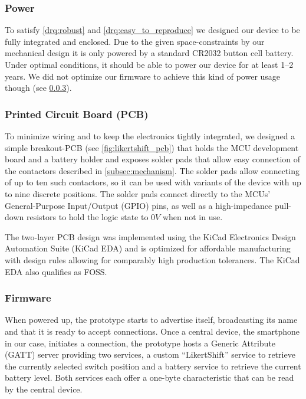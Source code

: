 \subsubsection{Power}

To satisfy \ref{drq:robust} and \ref{drq:easy_to_reproduce} we designed our device to be fully integrated and enclosed.
Due to the given space-constraints by our mechanical design it is only powered by a standard CR2032 button cell battery.
Under optimal conditions, it should be able to power our device for at least 1--2 years.
We did not optimize our firmware to achieve this kind of power usage though (see \ref{subsec:firmware}).

\subsubsection{Printed Circuit Board (PCB)}

To minimize wiring and to keep the electronics tightly integrated, we designed a simple breakout-PCB (see \autoref{fig:likertshift_pcb}) that holds the MCU development board and a battery holder and exposes solder pads that allow easy connection of the contactors described in \ref{subsec:mechanism}.
The solder pads allow connecting of up to ten such contactors, so it can be used with variants of the device with up to nine discrete positions.
The solder pads connect directly to the MCUs' General-Purpose Input/Output (GPIO) pins, as well as a high-impedance pull-down resistors to hold the logic state to $0V$ when not in use.

The two-layer PCB design was implemented using the KiCad Electronics Design Automation Suite (KiCad EDA) and is optimized for affordable manufacturing with design rules allowing for comparably high production tolerances.
The KiCad EDA also qualifies as FOSS.

\subsubsection{Firmware}\label{subsec:firmware}

\def\gpiohigh{\textsf{HIGH}\xspace}

When powered up, the prototype starts to advertise itself, broadcasting its name and that it is ready to accept connections.
Once a central device, the smartphone in our case, initiates a connection, the prototype hosts a Generic Attribute (GATT) server providing two services, a custom “LikertShift” service to retrieve the currently selected switch position and a battery service to retrieve the current battery level.
Both services each offer a one-byte characteristic that can be read by the central device.

